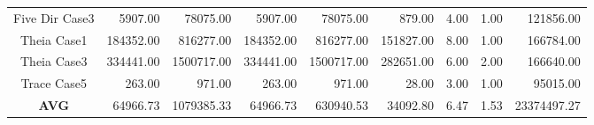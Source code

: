 \begin{table*}[!htb]
{\begin{tabular}{crrrrrrrr}
Five Dir Case3       & 5907.00                                              & 78075.00                                             & 5907.00                                     & 78075.00                                     & 879.00                                   & 4.00                                       & 1.00                                        & 121856.00                        \\
Theia Case1          & 184352.00                                            & 816277.00                                            & 184352.00                                   & 816277.00                                    & 151827.00                                & 8.00                                       & 1.00                                        & 166784.00                        \\
Theia Case3          & 334441.00                                            & 1500717.00                                           & 334441.00                                   & 1500717.00                                   & 282651.00                                & 6.00                                       & 2.00                                        & 166640.00                        \\
Trace Case5          & 263.00                                               & 971.00                                               & 263.00                                      & 971.00                                       & 28.00                                    & 3.00                                       & 1.00                                        & 95015.00                         \\
\textbf{AVG}         & 64966.73                                             & 1079385.33                                           & 64966.73                                    & 630940.53                                    & 34092.80                                 & 6.47                                       & 1.53                                        & 23374497.27                      \\ \hline
\end{tabular}
}
\end{table*}